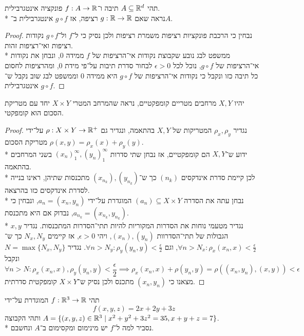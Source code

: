 \Question{}
תהי $A \subseteq \mathbb{R}^d$ תיבה ו־$f : A \to \mathbb{R}$ פונקציה אינטגרבילית. \\*
נראה שאם $g : \mathbb{R} \to \mathbb{R}$ רציפה, אז $g \circ f$ אינטגרבילית ב־$A$.
\begin{proof}
	נבחין כי הרכבת פונקציות רציפות משמרת רציפות ולכן נסיק כי ל־$f$ ול־$g \circ f$ נקודות רציפות ואי־רציפות זהות. \\*
	ממשפט לבג נובע שקבוצת נקודות אי־הרציפות של $f$ ממידה 0, ונבחן את נקודות אי־הרציפות של $g \circ f$, נוכל לכל $\epsilon > 0$ לבחור סדרת תיבות על־פי מידת 0,
	ומהרציפות לחסום כל תיבה כזו ונקבל כי נקודות אי־הרציפות של $g \circ f$ היא ממידה 0 וממשפט לבג שוב נקבל ש־$g \circ f$ אינטגרבילית.
\end{proof}

\Question{}
יהיו $X, Y$ מרחבים מטריים קומפקטיים, נראה שהמרחב המטרי $X \times Y$ יחד עם מטריקת הסכום הוא קומפקטי.
\begin{proof}
	נגדיר $\rho_x, \rho_y$ המטריקות של $X, Y$ בהתאמה, ונגדיר גם $\rho : X \times Y \to \mathbb{R}^+$ על־ידי $\rho(x, y) = \rho_x(x) + \rho_y(y)$ מטריקת הסכום. \\*
	ידוע ש־$X, Y$ הם קומפקטיים, אז נבחן שתי סדרות ${(x_n)}_1^\infty, {(y_n)}_1^\infty$ בשני המרחבים בהתאמה. \\*
	לכן קיימת סדרת אינדקסים $(n_k)$ כך ש־$(x_{n_k}), (y_{n_k})$ מתכנסות שתיהן, ראינו בנייה לסדרת אינדקסים כזו בהרצאה. \\*
	נבחן עתה את הסדרה $(a_n) \subseteq X \times Y$ המוגדרת על־ידי $a_n = (x_n, y_n)$, ונבחין כי $a_{n_k} = (x_{n_k}, y_{n_k})$, נבדוק אם היא מתכנסת. \\*
	נגדיר מטעמי נוחות את הסדרות המקוריות להיות תתי־הסדרות המתכנסות.
	נגדיר $x, y$ הגבולות של תתי־הסדרוות $(x_n), (y_n)$, ויהי $\epsilon > 0$, אז קיימים $N_x, N_y$ כך ש־$\forall n > N_x : \rho_x(x_n, x) < \frac{\epsilon}{2}$, וגם $\forall n > N_y : \rho_y(y_n, y) < \frac{\epsilon}{2}$.
	נגדיר $N = \max\{N_x, N_y\}$ ונקבל
	\[
		\forall n > N : \rho_x(x_n, x), \rho_y(y_n, y) < \frac{\epsilon}{2} \implies \rho_x(x_n, x) + \rho(y_n, y) = \rho((x_n, y_n), (x, y)) < \epsilon
	\]
	מצאנו כי $(x_n, y_n)$ מתכנס ולכן נסיק ש־$X \times Y$ קומפקטית סדרתית.
\end{proof}

\Question{}
תהי $f : \mathbb{R}^3 \to \mathbb{R}$ המוגדרת על־ידי
\[
	f(x, y, z) = 2x + 2y + 3z
\]
ותהי הקבוצה $A = \{ (x, y, z) \in \mathbb{R}^3 \mid x^2 + y^2 + 3z^2 = 35, x + y + z = 7 \}$. \\*
נסביר למה ל־$f$ יש מינימום ומקסימום ב־$A$ ונחשבם.

